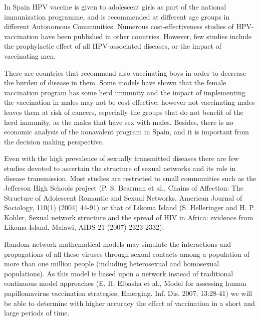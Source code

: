 In Spain HPV vaccine is given to adolescent girls as part of the national immunization programme, and is recommended at different age groups in different Autonomous Communities. Numerous cost-effectiveness studies of HPV-vaccination have been published in other countries. However, few studies include the prophylactic effect of all HPV-associated diseases, or the impact of vaccinating men.

There are countries that recommend also vaccinating boys in order to decrease the burden of disease in them. Some models have shown that the female vaccination program has some herd immunity and the impact of implementing the vaccination in males may not be cost effective, however not vaccinating males leaves them at risk of cancers, especially the groups that do not benefit of the herd immunity, as the males that have sex with males.
Besides, there is no economic analysis of the nonavalent program in Spain, and it is important from the decision making perspective.

Even with the high prevalence of sexually transmitted diseases there are few studies devoted to ascertain the structure of sexual networks and its role in disease transmission. Most studies are restricted to small communities such as the Jefferson High Schools project (P. S. Bearman et al., Chains of Affection: The Structure of Adolescent Romantic and Sexual Networks, American Journal of Sociology, 110(1) (2004) 44-91) or that of Likoma Island (S. Helleringer and H. P. Kohler, Sexual network structure and the spread of HIV in Africa: evidence from Likoma Island, Malawi, AIDS 21 (2007) 2323-2332).

Random network mathematical models may simulate the interactions and propagations of all these viruses through sexual contacts among a population of more than one million people (including heterosexual and homosexual populations). As this model is based upon a network instead of traditional continuous model approaches (E. H. Elbasha et al., Model for assessing human papillomavirus vaccination strategies,  Emerging. Inf. Dis.  2007; 13:28-41) we will be able to determine with higher accuracy the effect of vaccination in a short and large periods of time.

